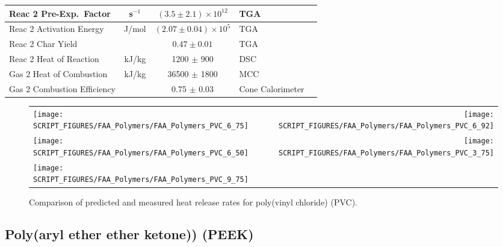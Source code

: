 \begin{table}[h!]
\begin{center}
\begin{tabular}{|l|c|c|l|l|}
Reac 2 Pre-Exp.~Factor      & s$^{-1}$      & $(3.5 \pm 2.1) \times 10^{12}$    & TGA                       &  \cite{Stoliarov:CF2010}                  \\ \hline
Reac 2 Activation Energy    & J/mol       & $(2.07 \pm 0.04) \times 10^{5}$   & TGA                       &  \cite{Stoliarov:CF2010}                  \\ \hline
Reac 2 Char Yield           &               & $0.47 \pm 0.01$                   & TGA                       &  \cite{Stoliarov:CF2010}                  \\ \hline
Reac 2 Heat of Reaction     & kJ/kg         & 1200 $\pm$ 900                    & DSC                       &  \cite{Stoliarov:PDS2008}                 \\ \hline
Gas 2 Heat of Combustion    & kJ/kg         & 36500 $\pm$ 1800                  & MCC                       &  \cite{Stoliarov:CF2010}                  \\ \hline
Gas 2 Combustion Efficiency &               & 0.75 $\pm$ 0.03                   & Cone Calorimeter          &  \cite{Stoliarov:CF2010}                  \\ \hline
\end{tabular}
\end{center}
\label{Properties_PVC}
\end{table}

\begin{figure}[p]
\begin{tabular*}{\textwidth}{l@{\extracolsep{\fill}}r}
\texttt{[image: SCRIPT\_FIGURES/FAA\_Polymers/FAA\_Polymers\_PVC\_6\_75]} &
\texttt{[image: SCRIPT\_FIGURES/FAA\_Polymers/FAA\_Polymers\_PVC\_6\_92]} \\
\texttt{[image: SCRIPT\_FIGURES/FAA\_Polymers/FAA\_Polymers\_PVC\_6\_50]} &
\texttt{[image: SCRIPT\_FIGURES/FAA\_Polymers/FAA\_Polymers\_PVC\_3\_75]} \\
\texttt{[image: SCRIPT\_FIGURES/FAA\_Polymers/FAA\_Polymers\_PVC\_9\_75]} &
\end{tabular*}
\caption[Heat release rate of poly(vinyl chloride) (PVC)]
{Comparison of predicted and measured heat release rates for poly(vinyl chloride) (PVC).}
\label{HRR_PVC}
\end{figure}

\clearpage



\subsection{Poly(aryl ether ether ketone)) (PEEK)}


